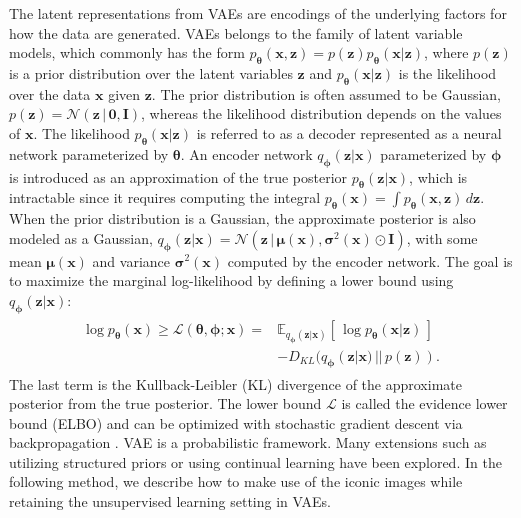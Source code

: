 The latent representations from VAEs are encodings of the underlying factors for how the data are generated. VAEs belongs to the family of latent variable models, which commonly has the form $p_{\boldsymbol{\theta}}(\mathbf{x},\mathbf{z}) = p(\mathbf{z}) p_{\boldsymbol{\theta}}(\mathbf{x}|\mathbf{z})$, where $p(\mathbf{z})$ is a prior distribution over the latent variables $\mathbf{z}$ and $p_{\boldsymbol{\theta}}(\mathbf{x}|\mathbf{z})$ is the likelihood over the data $\mathbf{x}$ given $\mathbf{z}$. The prior distribution is often assumed to be Gaussian,
$p(\mathbf{z}) = \mathcal{N}(\mathbf{z}\,|\, \boldsymbol{0}, \mathbf{I})$,  
whereas the likelihood distribution depends on the values of $\mathbf{x}$.
The likelihood $p_{\boldsymbol{\theta}}(\mathbf{x}|\mathbf{z})$ is referred to as a decoder represented as a neural network parameterized by $\boldsymbol{\theta}$. An encoder network $q_{\boldsymbol{\phi}}(\mathbf{z}|\mathbf{x})$ parameterized by $\boldsymbol{\phi}$ is introduced as an approximation of the true posterior $p_{\boldsymbol{\theta}}(\mathbf{z}|\mathbf{x})$, which is intractable since it requires computing the integral $p_{\boldsymbol{\theta}}(\mathbf{x}) = \int p_{\boldsymbol{\theta}}(\mathbf{x}, \mathbf{z}) \, d\mathbf{z}$. 
When the prior distribution is a Gaussian, the approximate posterior is also modeled as a Gaussian, $q_{\boldsymbol{\phi}}(\mathbf{z}|\mathbf{x}) = \mathcal{N}(\mathbf{z} \,|\,\boldsymbol{\mu}(\mathbf{x}), \boldsymbol{\sigma}^2(\mathbf{x}) \odot \mathbf{I})$, with some mean $\boldsymbol{\mu}(\mathbf{x})$ and variance $\boldsymbol{\sigma}^2(\mathbf{x})$ computed by the encoder network. The goal is to maximize the marginal log-likelihood by defining a lower bound using $q_{\boldsymbol{\phi}}(\mathbf{z}|\mathbf{x})$:
\begin{align}
\begin{split}\label{eq:vae-loss}
\log p_{\boldsymbol{\theta}}(\mathbf{x}) \geq \mathcal{L}(\boldsymbol{\theta}, \boldsymbol{\phi}; \mathbf{x}) = & \mathbb{E}_{q_{\boldsymbol{\phi}}(\mathbf{z}|\mathbf{x})}\left[\, \log p_{\boldsymbol{\theta}}(\mathbf{x} | \mathbf{z}) \,\right] \\ & -D_{KL}(q_{\boldsymbol{\phi}}(\mathbf{z}|\mathbf{x})\,||\,p(\mathbf{z})) .
\end{split}
\end{align}
The last term is the Kullback-Leibler (KL) divergence of the approximate posterior from the true posterior. The lower bound $\mathcal{L}$ is called the evidence lower bound (ELBO) and can be optimized with stochastic gradient descent via backpropagation . 
VAE is a probabilistic framework. Many extensions such as utilizing structured priors or using continual learning  have been explored.
In the following method, we describe how to make use of the iconic images while retaining the unsupervised learning setting in VAEs.

